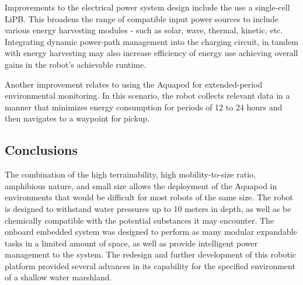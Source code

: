 Improvements to the electrical power system design include the use a single-cell LiPB. This broadens the range of compatible input power sources to include various energy harvesting modules - such as solar, wave, thermal, kinetic, etc.  Integrating dynamic power-path management into the charging circuit, in tandem with energy harvesting may also increase efficiency of energy use achieving overall gains in the robot's achievable runtime.

Another improvement relates to using the Aquapod for extended-period environmental monitoring. In this scenario, the robot collects relevant data in a manner that minimizes energy consumption for periods of 12 to 24 hours and then navigates to a waypoint for pickup.


\subsection{ Conclusions}

	The combination of the high terrainability, high mobility-to-size ratio, amphibious nature, and small size allows the deployment of the Aquapod in environments that would be difficult for most robots of the same size. The robot is designed to withstand water pressures up to 10 meters in depth, as well as be chemically compatible with the potential substances it may encounter.  The onboard embedded system was designed to perform as many modular expandable tasks in a limited amount of space, as well as provide intelligent power management to the system.  The redesign and further development of this robotic platform provided several advances in its capability for the specified environment of a shallow water marshland.
